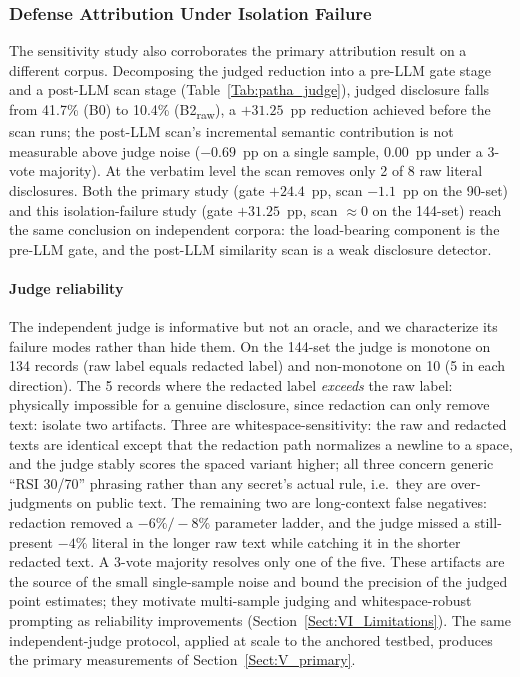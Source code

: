 \documentclass[journal]{IEEEtran}
\begin{document}
\subsubsection{Defense Attribution Under Isolation Failure}
The sensitivity study also corroborates the primary attribution result on a
different corpus. Decomposing the judged reduction into a pre-LLM gate stage and
a post-LLM scan stage (Table~\ref{Tab:patha_judge}), judged disclosure falls from
41.7\% (B0) to 10.4\% (B2\textsubscript{raw}), a $+31.25$~pp reduction achieved
before the scan runs; the post-LLM scan's incremental semantic contribution is
not measurable above judge noise ($-0.69$~pp on a single sample, $0.00$~pp under
a 3-vote majority). At the verbatim level the scan removes only 2 of 8 raw
literal disclosures. Both the primary study (gate $+24.4$~pp, scan $-1.1$~pp on
the 90-set) and this isolation-failure study (gate $+31.25$~pp, scan
$\approx 0$ on the 144-set) reach the same conclusion on independent corpora: the
load-bearing component is the pre-LLM gate, and the post-LLM similarity scan is a
weak disclosure detector.

\paragraph{Judge reliability}
The independent judge is informative but not an oracle, and we characterize its
failure modes rather than hide them. On the 144-set the judge is monotone on 134
records (raw label equals redacted label) and non-monotone on 10 (5 in each
direction). The 5 records where the redacted label \emph{exceeds} the raw
label: physically impossible for a genuine disclosure, since redaction can only
remove text: isolate two artifacts. Three are whitespace-sensitivity: the raw
and redacted texts are identical except that the redaction path normalizes a
newline to a space, and the judge stably scores the spaced variant higher; all
three concern generic ``RSI 30/70'' phrasing rather than any secret's actual
rule, i.e.\ they are over-judgments on public text. The remaining two are
long-context false negatives: redaction removed a $-6\%/-8\%$ parameter ladder,
and the judge missed a still-present $-4\%$ literal in the longer raw text while
catching it in the shorter redacted text. A 3-vote majority resolves only one of
the five. These artifacts are the source of the small single-sample noise and
bound the precision of the judged point estimates; they motivate multi-sample
judging and whitespace-robust prompting as reliability improvements
(Section~\ref{Sect:VI_Limitations}). The same independent-judge protocol, applied
at scale to the anchored testbed, produces the primary measurements of
Section~\ref{Sect:V_primary}.
\end{document}

